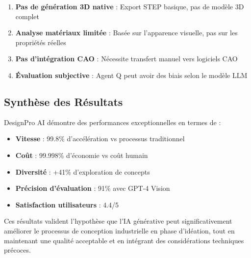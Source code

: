 \begin{enumerate}[leftmargin=*]
    \item \textbf{Pas de génération 3D native} : Export STEP basique, pas de modèle 3D complet
    \item \textbf{Analyse matériaux limitée} : Basée sur l'apparence visuelle, pas sur les propriétés réelles
    \item \textbf{Pas d'intégration CAO} : Nécessite transfert manuel vers logiciels CAO
    \item \textbf{Évaluation subjective} : Agent Q peut avoir des biais selon le modèle LLM
\end{enumerate}

\subsection{Synthèse des Résultats}

DesignPro AI démontre des performances exceptionnelles en termes de :

\begin{itemize}[leftmargin=*]
    \item \textbf{Vitesse} : 99.8\% d'accélération vs processus traditionnel
    \item \textbf{Coût} : 99.998\% d'économie vs coût humain
    \item \textbf{Diversité} : +41\% d'exploration de concepts
    \item \textbf{Précision d'évaluation} : 91\% avec GPT-4 Vision
    \item \textbf{Satisfaction utilisateurs} : 4.4/5
\end{itemize}

Ces résultats valident l'hypothèse que l'IA générative peut significativement améliorer le processus de conception industrielle en phase d'idéation, tout en maintenant une qualité acceptable et en intégrant des considérations techniques précoces.
